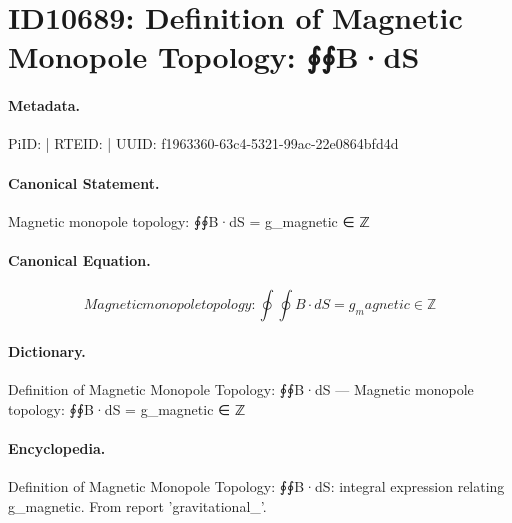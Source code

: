 \section*{ID10689: Definition of Magnetic Monopole Topology: ∮∮B·dS}
\paragraph{Metadata.}
PiID:  | RTEID:  | UUID: f1963360-63c4-5321-99ac-22e0864bfd4d

\paragraph{Canonical Statement.}
Magnetic monopole topology: ∮∮B·dS = g\_magnetic ∈ ℤ

\paragraph{Canonical Equation.}
\[
Magnetic monopole topology: ∮∮B·dS = g_magnetic ∈ ℤ
\]

\paragraph{Dictionary.}
Definition of Magnetic Monopole Topology: ∮∮B·dS — Magnetic monopole topology: ∮∮B·dS = g\_magnetic ∈ ℤ

\paragraph{Encyclopedia.}
Definition of Magnetic Monopole Topology: ∮∮B·dS: integral expression relating g\_magnetic. From report 'gravitational\_'.
